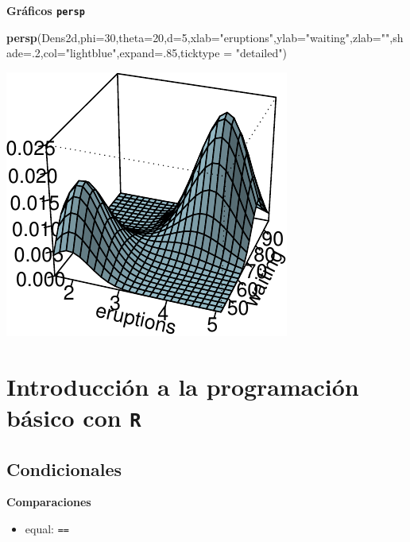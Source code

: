 \documentclass[]{article}
\def\tightlist{}
\newenvironment{Shaded}{\begin{snugshade}}{\end{snugshade}}
\newcommand{\KeywordTok}[1]{\textcolor[rgb]{0.13,0.29,0.53}{\textbf{{#1}}}}
\newcommand{\DataTypeTok}[1]{\textcolor[rgb]{0.13,0.29,0.53}{{#1}}}
\newcommand{\DecValTok}[1]{\textcolor[rgb]{0.00,0.00,0.81}{{#1}}}
\newcommand{\StringTok}[1]{\textcolor[rgb]{0.31,0.60,0.02}{{#1}}}
\newcommand{\NormalTok}[1]{{#1}}
\numberwithin{equation}{section}
\begin{document}
\textbf{Gráficos \texttt{persp}}

\begin{Shaded}
\begin{Highlighting}[]
\KeywordTok{persp}\NormalTok{(Dens2d,}\DataTypeTok{phi=}\DecValTok{30}\NormalTok{,}\DataTypeTok{theta=}\DecValTok{20}\NormalTok{,}\DataTypeTok{d=}\DecValTok{5}\NormalTok{,}\DataTypeTok{xlab=}\StringTok{"eruptions"}\NormalTok{,}\DataTypeTok{ylab=}\StringTok{"waiting"}\NormalTok{,}\DataTypeTok{zlab=}\StringTok{""}\NormalTok{,}\DataTypeTok{shade=}\NormalTok{.}\DecValTok{2}\NormalTok{,}\DataTypeTok{col=}\StringTok{"lightblue"}\NormalTok{,}\DataTypeTok{expand=}\NormalTok{.}\DecValTok{85}\NormalTok{,}\DataTypeTok{ticktype =} \StringTok{"detailed"}\NormalTok{)}
\end{Highlighting}
\end{Shaded}

\includegraphics{tema1_files/figure-latex/unnamed-chunk-113-1.pdf}

\section{\texorpdfstring{Introducción a la programación básico con
\texttt{R}}{Introducción a la programación básico con R}}\label{introduccion-a-la-programacion-basico-con-r}

\subsection{Condicionales}\label{condicionales}

\textbf{Comparaciones}

\begin{itemize}
\tightlist
\item
  equal: \texttt{==}
\end{itemize}
\end{document}
